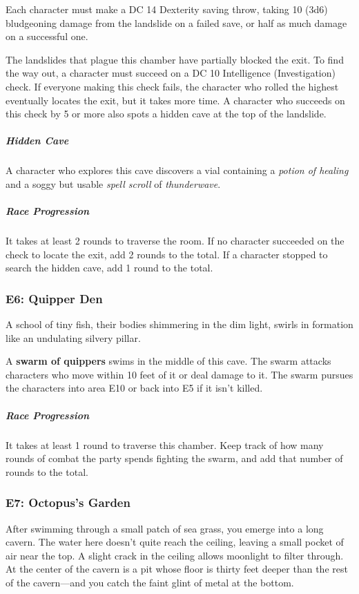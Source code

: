 \documentclass[10pt,a4paper,twoside,fancy,bg=print,twocolumn,openany,nodeprecatedcode]{dndbook}
\begin{document}
Each character must make a DC 14 Dexterity saving throw, taking 10 (3d6) bludgeoning damage from the landslide on a failed save, or half as much damage on a successful one.

The landslides that plague this chamber have partially blocked the exit. To find the way out, a character must succeed on a DC 10 Intelligence (Investigation) check. If everyone making this check fails, the character who rolled the highest eventually locates the exit, but it takes more time. A character who succeeds on this check by 5 or more also spots a hidden cave at the top of the landslide.

\subparagraph{Hidden Cave}
A character who explores this cave discovers a vial containing a \textit{potion of healing} and a soggy but usable \textit{spell scroll} of \textit{thunderwave}.

\subparagraph{Race Progression}
It takes at least 2 rounds to traverse the room. If no character succeeded on the check to locate the exit, add 2 rounds to the total. If a character stopped to search the hidden cave, add 1 round to the total.

\subsubsection{E6: Quipper Den}
\begin{DndReadAloud}{}
A school of tiny fish, their bodies shimmering in the dim light, swirls in formation like an undulating silvery pillar.

\end{DndReadAloud}

A \textbf{swarm of quippers} swims in the middle of this cave. The swarm attacks characters who move within 10 feet of it or deal damage to it. The swarm pursues the characters into area E10 or back into E5 if it isn't killed.

\subparagraph{Race Progression}
It takes at least 1 round to traverse this chamber. Keep track of how many rounds of combat the party spends fighting the swarm, and add that number of rounds to the total.

\subsubsection{E7: Octopus's Garden}
\begin{DndReadAloud}{}
After swimming through a small patch of sea grass, you emerge into a long cavern. The water here doesn't quite reach the ceiling, leaving a small pocket of air near the top. A slight crack in the ceiling allows moonlight to filter through. At the center of the cavern is a pit whose floor is thirty feet deeper than the rest of the cavern—and you catch the faint glint of metal at the bottom.

\end{DndReadAloud}
\end{document}

